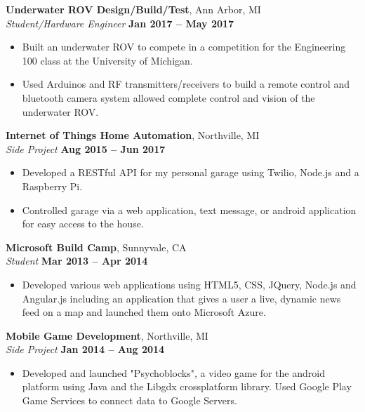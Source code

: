 \documentclass[margin,line]{resume}
\begin{document}
\begin{resume}
\textbf{Underwater ROV Design/Build/Test}, Ann Arbor, MI \vspace{2mm}\\\vspace{1mm}%
\textsl{Student/Hardware Engineer} \hfill \textbf{Jan 2017 -- May 2017}
\begin{itemize}
	\item Built an underwater ROV to compete in a competition for the Engineering 100 class at the University of Michigan.
	\item Used Arduinos and RF transmitters/receivers to build a remote control and bluetooth camera system allowed complete control and vision of the underwater ROV.
	
\end{itemize}

	\textbf{Internet of Things Home Automation}, Northville, MI \vspace{2mm}\\\vspace{1mm}%
	\textsl{Side Project} \hfill \textbf{Aug 2015 -- Jun 2017}
	\begin{itemize}
		\item Developed a RESTful API for my personal garage using Twilio, Node.js and a Raspberry Pi. 
		\item Controlled garage via a web application, text message, or android application for easy access to the house. 
	\end{itemize}


    \textbf{Microsoft Build Camp}, Sunnyvale, CA \vspace{2mm}\\\vspace{1mm}%
    \textsl{Student} \hfill \textbf{Mar 2013 -- Apr 2014}
    \begin{itemize}
    	\item Developed various web applications using HTML5, CSS, JQuery, Node.js and Angular.js including an application that gives a user a live, dynamic news feed on a map and launched them onto Microsoft Azure. 
    \end{itemize}
 
    \textbf{Mobile Game Development}, Northville, MI \vspace{2mm}\\\vspace{1mm}%
    \textsl{Side Project} \hfill \textbf{Jan 2014 -- Aug 2014}
    \begin{itemize}
    	\item 	Developed and launched "Psychoblocks", a video game for the android platform using Java and the Libgdx cross­platform library. Used Google Play Game Services to connect data to Google Servers.
    \end{itemize}
	

\end{resume}
\end{document}
